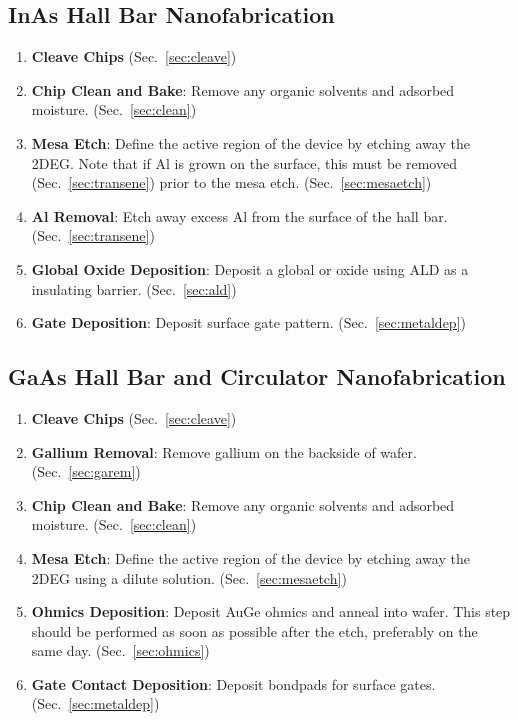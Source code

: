 \subsection{InAs Hall Bar Nanofabrication}
\begin{enumerate}
    \item \textbf{Cleave Chips} (Sec.~\ref{sec:cleave})
    \item \textbf{Chip Clean and Bake}: Remove any organic solvents and adsorbed moisture. (Sec.~\ref{sec:clean})
    \item \textbf{Mesa Etch}: Define the active region of the device by etching away the 2DEG. Note that if Al is grown on the surface, this must be removed (Sec.~\ref{sec:transene}) prior to the mesa etch. (Sec.~\ref{sec:mesaetch})
    \item \textbf{Al Removal}: Etch away excess Al from the surface of the hall bar. (Sec.~\ref{sec:transene})
    \item \textbf{Global Oxide Deposition}: Deposit a global  or  oxide using ALD as a insulating barrier. (Sec.~\ref{sec:ald})
    \item \textbf{Gate Deposition}: Deposit surface gate pattern. (Sec.~\ref{sec:metaldep})
\end{enumerate}

\subsection{GaAs Hall Bar and Circulator Nanofabrication}
\begin{enumerate}
    \item \textbf{Cleave Chips} (Sec.~\ref{sec:cleave})
    \item \textbf{Gallium Removal}: Remove gallium on the backside of wafer. (Sec.~\ref{sec:garem})
    \item \textbf{Chip Clean and Bake}: Remove any organic solvents and adsorbed moisture. (Sec.~\ref{sec:clean})
    \item \textbf{Mesa Etch}: Define the active region of the device by etching away the 2DEG using a dilute  solution. (Sec.~\ref{sec:mesaetch})
    \item \textbf{Ohmics Deposition}: Deposit AuGe ohmics and anneal into wafer. This step should be performed as soon as possible after the etch, preferably on the same day. (Sec.~\ref{sec:ohmics})
    \item \textbf{Gate Contact Deposition}: Deposit bondpads for surface gates. (Sec.~\ref{sec:metaldep})
\end{enumerate}


